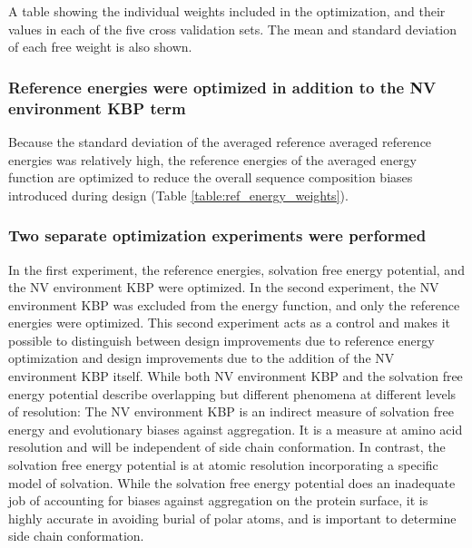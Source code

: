 \begin{table}
\scriptsize
\renewcommand{\tabcolsep}{0.09cm}
\centering

\caption{A table showing the individual weights included in the optimization, and their values in each of the five cross validation sets.  The mean and standard deviation of each free weight is also shown. }
\label{table:energy_weights}
\end{table}

\subsubsection{Reference energies were optimized in addition to the \acs{NV} environment \acs{KBP} term}
Because the standard deviation of the averaged reference averaged reference energies was relatively high, the reference energies of the averaged energy function are optimized to reduce the overall sequence composition biases introduced during design (Table \ref{table:ref_energy_weights}).

\subsubsection{Two separate optimization experiments were performed}
In the first experiment, the reference energies, solvation free energy potential, and the \ac{NV} environment \ac{KBP} were optimized.
In the second experiment, the \ac{NV} environment \ac{KBP} was excluded from the energy function, and only the reference energies were optimized.
This second experiment acts as a control and makes it possible to distinguish between design improvements due to reference energy optimization and design improvements due to the addition of the \ac{NV} environment \ac{KBP} itself.
While both \ac{NV} environment \ac{KBP} and the solvation free energy potential describe overlapping but different phenomena at different levels of resolution: The \ac{NV} environment \ac{KBP} is an indirect measure of solvation free energy and evolutionary biases against aggregation.
It is a measure at amino acid resolution and will be independent of side chain conformation.
In contrast, the solvation free energy potential is at atomic resolution incorporating a specific model of solvation.
While the solvation free energy potential does an inadequate job of accounting for biases against aggregation on the protein surface, it is highly accurate in avoiding burial of polar atoms, and is important to determine side chain conformation.

